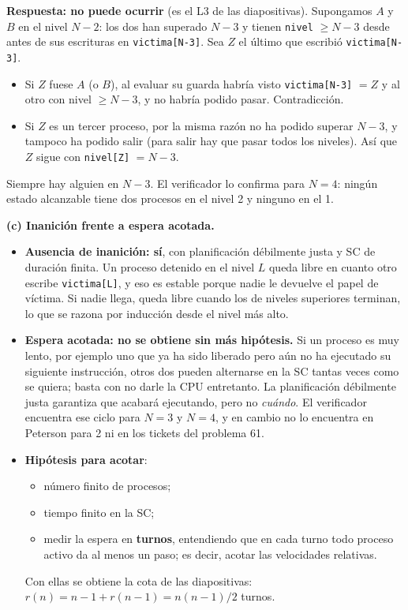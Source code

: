 \documentclass[11pt,a4paper,oneside]{report}
\begin{document}
\begin{solucion}
\textbf{Respuesta: no puede ocurrir} (es el L3 de las diapositivas). Supongamos $A$ y $B$ en el nivel $N - 2$:
los dos han superado $N - 3$ y tienen \texttt{nivel} $\ge N-3$ desde antes de sus escrituras en
\texttt{victima[N-3]}. Sea $Z$ el último que escribió \texttt{victima[N-3]}.
\begin{itemize}[leftmargin=*,noitemsep]
  \item Si $Z$ fuese $A$ (o $B$), al evaluar su guarda habría visto \texttt{victima[N-3]} $= Z$ y al otro con
        nivel $\ge N - 3$, y no habría podido pasar. Contradicción.
  \item Si $Z$ es un tercer proceso, por la misma razón no ha podido superar $N - 3$, y tampoco ha podido salir
        (para salir hay que pasar todos los niveles). Así que $Z$ sigue con \texttt{nivel[Z]} $= N - 3$.
\end{itemize}
Siempre hay alguien en $N-3$. El verificador lo confirma para $N = 4$: ningún estado alcanzable tiene dos procesos
en el nivel 2 y ninguno en el 1.

\textbf{(c) Inanición frente a espera acotada.}
\begin{itemize}[leftmargin=*]
  \item \textbf{Ausencia de inanición: sí}, con planificación débilmente justa y SC de duración finita. Un proceso
        detenido en el nivel $L$ queda libre en cuanto otro escribe \texttt{victima[L]}, y eso es estable porque
        nadie le devuelve el papel de víctima. Si nadie llega, queda libre cuando los de niveles superiores
        terminan, lo que se razona por inducción desde el nivel más alto.
  \item \textbf{Espera acotada: no se obtiene sin más hipótesis.} Si un proceso es muy lento, por ejemplo uno que
        ya ha sido liberado pero aún no ha ejecutado su siguiente instrucción, otros dos pueden alternarse en la
        SC tantas veces como se quiera; basta con no darle la CPU entretanto. La planificación débilmente justa
        garantiza que acabará ejecutando, pero no \emph{cuándo}. El verificador encuentra ese ciclo para $N = 3$
        y $N = 4$, y en cambio no lo encuentra en Peterson para 2 ni en los tickets del problema 61.
  \item \textbf{Hipótesis para acotar}:
        \begin{itemize}[leftmargin=*,noitemsep]
          \item número finito de procesos;
          \item tiempo finito en la SC;
          \item medir la espera en \textbf{turnos}, entendiendo que en cada turno todo proceso activo da al menos un
                paso; es decir, acotar las velocidades relativas.
        \end{itemize}
        Con ellas se obtiene la cota de las diapositivas: $r(n) = n - 1 + r(n-1) = n(n-1)/2$ turnos.
\end{itemize}
\end{solucion}
\end{document}

